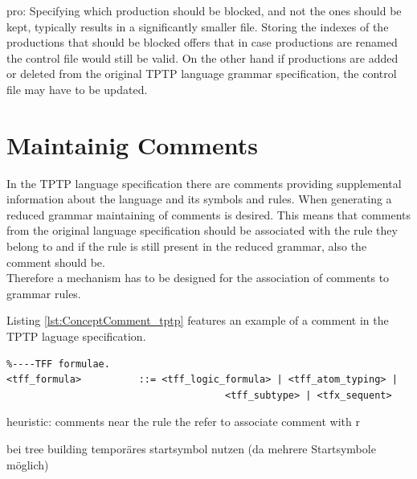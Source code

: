 pro: Specifying which production should be blocked, and not the ones should be kept, typically results in a significantly smaller file.
Storing the indexes of the productions that should be blocked offers that in case productions are renamed the control file would still be valid. On the other hand if productions are added or deleted from the original \ac{TPTP} language grammar specification, the control file may have to be updated.


\section{Maintainig Comments}\label{sec:ConceptMaintainingComments}
In the \ac{TPTP} language specification there are comments providing supplemental information about the language and its symbols and rules.
When generating a reduced grammar maintaining of comments is desired. This means that comments from the original language specification should be associated with the rule they belong to and if the rule is still present in the reduced grammar, also the comment should be.\\
Therefore a mechanism has to be designed for the association of comments to grammar rules.

Listing \ref{lst:ConceptComment_tptp} features an example of a comment in the \ac{TPTP} laguage specification.
\begin{lstlisting}[basicstyle=\scriptsize	,caption= Example of a comment in the \ac{TPTP} language specification,label= lst:ConceptComment_tptp]
%----Top of Page---------------------------------------------------------------
%----TFF formulae.
<tff_formula>          ::= <tff_logic_formula> | <tff_atom_typing> |
                           			  <tff_subtype> | <tfx_sequent>
\end{lstlisting}
heuristic:
comments near the rule the refer to
associate comment with r

bei tree building temporäres startsymbol nutzen (da mehrere Startsymbole möglich)

